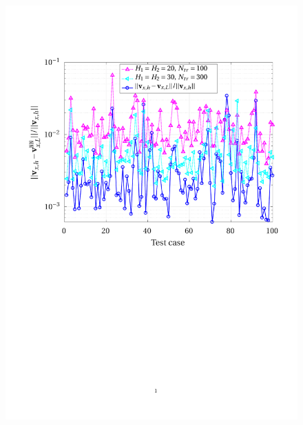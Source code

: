 \documentclass[12pt, a4paper, twoside, openright]{report}
\numberwithin{equation}{chapter}
\theoremstyle{theorem}
\theoremstyle{definition}
\theoremstyle{remark}
\theoremstyle{proposition}
\numberwithin{figure}{chapter}
\begin{document}
	\begin{figure}[H]
		\center
		\includegraphics[scale = 0.75, trim = {1.5cm 12cm 1cm 3.5cm}, clip]{dc_200_vx_pointwise_error_nn}
	\end{figure}
	
\end{document}

